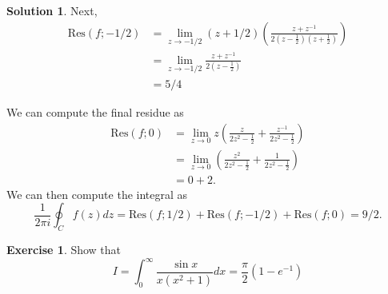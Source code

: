 \documentclass[12pt]{article}
\newcommand{\Res}{\text{Res}}
\theoremstyle{definition}
\newtheorem{exer}{Exercise}
\newtheorem{sol}{Solution}
\theoremstyle{remark}
\begin{document}
\begin{sol}
Next, 
\begin{align*}
    \Res(f; -1/2) &= \lim_{z\to -1/2} (z+1/2) \left(\frac{z + z^{-1}}{2 (z- \frac{1}{2})(z+\frac{1}{2})}\right)\\
                 &= \lim_{z\to -1/2} \frac{z + z^{-1}}{2 (z-\frac{1}{2})}\\
                 &= 5 / 4
\end{align*}

We can compute the final residue as 
\begin{align*}
    \Res(f; 0) &= \lim_{z\to 0} z \left(\frac{z}{2z^2 - \frac{1}{2}} + \frac{z^{-1}}{2z^2 - \frac{1}{2}}  \right)\\
               &= \lim_{z\to 0} \left(\frac{z^{2}}{2z^2 - \frac{1}{2}} + \frac{1}{2z^2 - \frac{1}{2}}  \right)\\
               &= 0 + 2.
\end{align*}
We can then compute the integral as 
\begin{equation*}
    \frac{1}{2\pi i} \oint_C f(z)dz = \Res(f; 1/2) + \Res(f; -1/2) + \Res(f;0) = 9 / 2.
    \end{equation*}
\end{sol}

\newpage

\begin{exer}
    Show that 
    \begin{equation*}
        I = \int_{0}^{\infty} \frac{\sin x}{x(x^2+1)} dx = \frac{\pi}{2} (1 - e^{-1})
    \end{equation*}
\end{exer}
\end{document}
